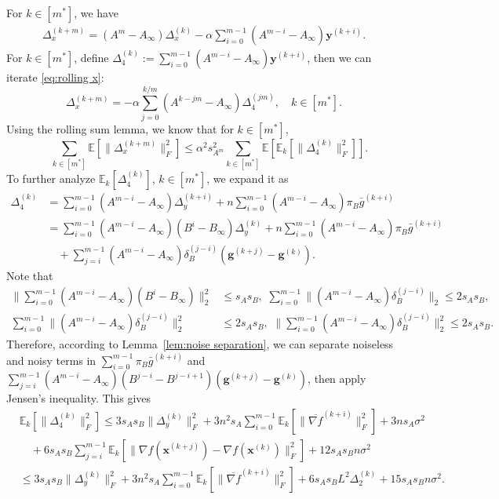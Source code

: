 \documentclass[10pt]{article}
\newcommand{\vg}{{\mathbf{g}}}
\newcommand{\vx}{{\mathbf{x}}}
\newcommand{\vy}{{\mathbf{y}}}
\newcommand{\EE}{\mathbb{E}}
\newcommand{\norm}[1]{\| #1 \|}
\begin{document}
For $k\in[m^*]$, we have
\begin{align}\label{eq:rolling x}
    \Delta_x^{(k+m)} = (A^m-A_\infty)\Delta_x^{(k)}-\alpha \sum_{i=0}^{m-1}(A^{m-i}-A_\infty)\vy^{(k+i)}.
\end{align}
For $k\in [m^*]$, define 
\(\Delta_4^{(k)}:=\sum_{i=0}^{m-1}(A^{m-i}-A_\infty)\vy^{(k+i)}\), 
then we can iterate \eqref{eq:rolling x}:
\[\Delta_x^{(k+m)} =-\alpha \sum_{j=0}^{k/m}(A^{k-jm}-A_\infty)\Delta_4^{(jm)},\quad k\in[m^*].\]
Using the rolling sum lemma, we know that for $k\in[m^*]$, 
\[\quad\sum_{k\in[m^*]}\EE[\norm{\Delta_x^{(k+m)}}_F^2]\le \alpha^2s_{A^m}^2\sum_{k\in[m^*]}\EE[\EE_k[\norm{\Delta_4^{(k)}}_F^2]].\]
To further analyze $\EE_k[\Delta_4^{(k)}]$, $k\in [m^*]$, we expand it as
\begin{align*}
    \Delta_4^{(k)}&= \sum_{i=0}^{m-1}(A^{m-i}-A_\infty)\Delta_y^{(k+i)}+ n \sum_{i=0}^{m-1}(A^{m-i}-A_\infty)\pi_B\bar{g}^{(k+i)}\\
    &=\sum_{i=0}^{m-1}(A^{m-i}-A_\infty)(B^i-B_\infty)\Delta_y^{(k)} + n \sum_{i=0}^{m-1}(A^{m-i}-A_\infty)\pi_B\bar{g}^{(k+i)}\\
    &\quad + \sum_{j=i}^{m-1}(A^{m-i}-A_\infty)\delta_B^{(j-i)}(\vg^{(k+j)}-\vg^{(k)}).
\end{align*}
Note that 
\begin{align*}
    \norm{\sum_{i=0}^{m-1}(A^{m-i}-A_\infty)(B^i-B_\infty)}_2^2 &\le s_As_B, \,\,
    \sum_{i=0}^{m-1}\norm{(A^{m-i}-A_\infty)\delta_B^{(j-i)}}_2\le 2s_As_B,\\
    \sum_{i=0}^{m-1}\norm{(A^{m-i}-A_\infty)\delta_B^{(j-i)}}_2^2&\le 2s_As_B,\,\,
    \norm{\sum_{i=0}^{m-1}(A^{m-i}-A_\infty)\delta_B^{(j-i)}}_2^2\le 2s_As_B.
\end{align*}
Therefore, according to Lemma~\ref{lem:noise separation}, we can separate noiseless and noisy terms in $\sum_{i=0}^{m-1}\pi_B\bar{g}^{(k+i)}$ and $\sum_{j=i}^{m-1}(A^{m-i}-A_\infty)(B^{j-i}-B^{j-i+1})(\vg^{(k+j)}-\vg^{(k)})$, then apply Jensen's inequality. This gives
\begin{align*}
    &\EE_k[\norm{\Delta_4^{(k)}}_F^2]\le 3s_As_B\norm{\Delta_y^{(k)}}_F^2+3n^2s_A\sum_{i=0}^{m-1}\EE_k[\norm{\overline{\nabla f}^{(k+i)}}_F^2]+3ns_A\sigma^2\\
    &\quad+6s_As_B\sum_{j=i}^{m-1}\EE_k[\norm{\nabla f(\vx^{(k+j)})-\nabla f(\vx^{(k)})}_F^2]+12s_As_Bn\sigma^2\\
    &\le 3s_As_B\norm{\Delta_y^{(k)}}_F^2+3n^2s_A\sum_{i=0}^{m-1}\EE_k[\norm{\overline{\nabla f}^{(k+i)}}_F^2]+6s_As_BL^2\Delta_2^{(k)}+15s_As_Bn\sigma^2.
\end{align*}
\end{document}
